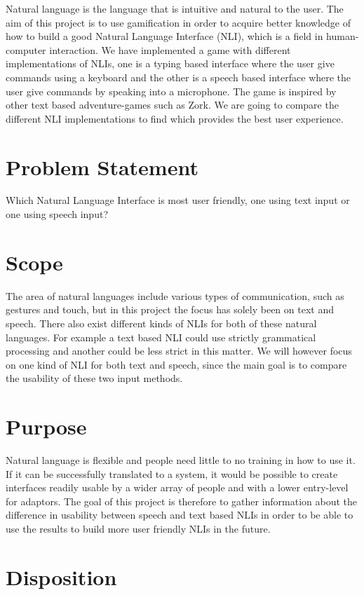 Natural language is the language that is intuitive and natural to the user. The aim of this project is to use gamification in order to acquire better knowledge of how to build a good Natural Language Interface (NLI), which is a field in human-computer interaction. We have implemented a game with different implementations of NLIs, one is a typing based interface where the user give commands using a keyboard and the other is a speech based interface where the user give commands by speaking into a microphone. The game is inspired by other text based adventure-games such as Zork. We are going to compare the different NLI implementations to find which provides the best user experience.

\section{Problem Statement}
Which Natural Language Interface is most user friendly, one using text input or one using speech input?

\section{Scope}
The area of natural languages include various types of communication, such as gestures and touch, but in this project the focus has solely been on text and speech. There also exist different kinds of NLIs for both of these natural languages. For example a text based NLI could use strictly grammatical processing and another could be less strict in this matter. We will however focus on one kind of NLI for both text and speech, since the main goal is to compare the usability of these two input methods.

\section{Purpose}
Natural language is flexible and people need little to no training in how to use it. If it can be successfully translated to a system, it would be possible to create interfaces readily usable by a wider array of people and with a lower entry-level for adaptors. The goal of this project is therefore to gather information about the difference in usability between speech and text based NLIs in order to be able to use the results to build more user friendly NLIs in the future.

\section{Disposition}


